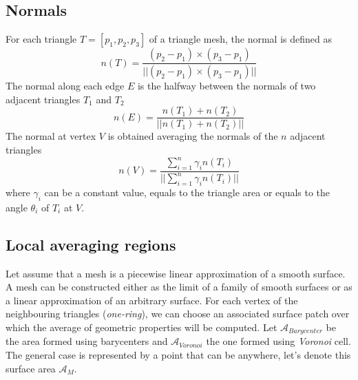 \subsection{Normals}
For each triangle $T=[p_1, p_2, p_3]$ of a triangle mesh, the normal is defined as
$$n(T) = \frac{(p_2 - p_1) \times (p_3 - p_1)}{||(p_2 - p_1) \times (p_3 - p_1)||}$$
The normal along each edge $E$ is the halfway between the normals of two adjacent triangles $T_1$ and $T_2$
$$n(E) = \frac{n(T_1) + n(T_2)}{||n(T_1) + n(T_2)||}$$
The normal at vertex $V$ is obtained averaging the normals of the $n$ adjacent triangles
$$n(V) = \frac{\sum_{i =1}^n \gamma_i n(T_i)}{||\sum_{i =1}^n \gamma_i n(T_i)||}$$
where $\gamma_i$ can be a constant value, equals to the triangle area or equals to the angle $\theta_i$ of $T_i$ at $V$.
\cite{geometryprocessing}

\subsection{Local averaging regions} \label{section:localaveraging}
Let assume that a mesh is a piecewise linear approximation of a smooth surface.
A mesh can be constructed either as the limit of a family of smooth surfaces or as a linear approximation of an arbitrary surface. For each vertex of the neighbouring triangles (\textit{one-ring}), we can choose an associated surface patch over which the average of geometric properties will be computed.
Let $\mathcal{A}_{Barycenter}$ be the area formed using barycenters and $\mathcal{A}_{Voronoi}$ the one formed using \textit{Voronoi} cell. The general case is represented by a point that can be anywhere, let's denote this surface area $\mathcal{A}_M$.

